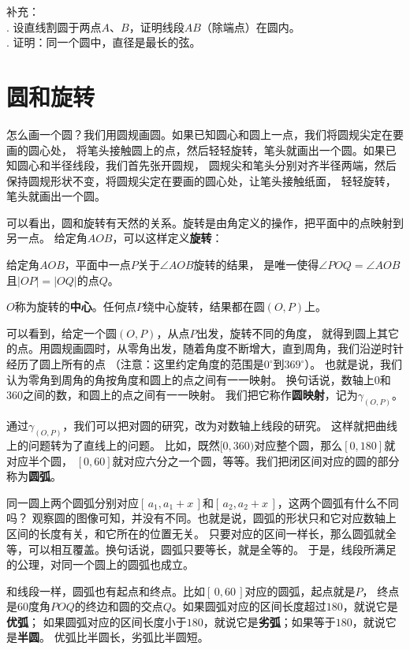 \documentclass[12pt,UTF8,fontset=none]{ctexbook}
\begin{document}
\begin{xt}\label{xt:0-0-0}
    补充：\\
    . 设直线割圆于两点$A$、$B$，证明线段$AB$（除端点）在圆内。\\
    . 证明：同一个圆中，直径是最长的弦。
\end{xt}

\section{圆和旋转}
怎么画一个圆？我们用圆规画圆。如果已知圆心和圆上一点，我们将圆规尖定在要画的圆心处，
将笔头接触圆上的点，然后轻轻旋转，笔头就画出一个圆。如果已知圆心和半径线段，我们首先张开圆规，
圆规尖和笔头分别对齐半径两端，然后保持圆规形状不变，将圆规尖定在要画的圆心处，让笔头接触纸面，
轻轻旋转，笔头就画出一个圆。

可以看出，圆和旋转有天然的关系。旋转是由角定义的操作，把平面中的点映射到另一点。
给定角$AOB$，可以这样定义\textbf{旋转}：

\begin{df}\label{df:0-1-0}
    给定角$AOB$，平面中一点$P$关于$\angle AOB$旋转的结果，
    是唯一使得$\angle POQ = \angle AOB$且$|OP| = |OQ|$的点$Q$。
\end{df}
$O$称为旋转的\textbf{中心}。任何点$P$绕中心旋转，结果都在圆$(O,P)$上。

可以看到，给定一个圆$(O,P)$，从点$P$出发，旋转不同的角度，
就得到圆上其它的点。用圆规画圆时，从零角出发，随着角度不断增大，直到周角，我们沿逆时针经历了圆上所有的点
（注意：这里约定角度的范围是$0^\circ$到$369^\circ$）。
也就是说，我们认为零角到周角的角按角度和圆上的点之间有一一映射。
换句话说，数轴上$0$和$360$之间的数，和圆上的点之间有一一映射。
我们把它称作\textbf{圆映射}，记为$\gamma_{(O,P)}$。

通过$\gamma_{(O,P)}$，我们可以把对圆的研究，改为对数轴上线段的研究。
这样就把曲线上的问题转为了直线上的问题。
比如，既然$[0, 360)$对应整个圆，那么$[0,180]$就对应半个圆，
$[0,60]$就对应六分之一个圆，等等。我们把闭区间对应的圆的部分称为\textbf{圆弧}。

同一圆上两个圆弧分别对应$[\, a_1, a_1+x\, ]$和$[\, a_2, a_2+x \,]$，这两个圆弧有什么不同吗？
观察圆的图像可知，并没有不同。也就是说，圆弧的形状只和它对应数轴上区间的长度有关，和它所在的位置无关。
只要对应的区间一样长，那么圆弧就全等，可以相互覆盖。换句话说，圆弧只要等长，就是全等的。
于是，线段所满足的公理，对同一个圆上的圆弧也成立。

和线段一样，圆弧也有起点和终点。比如$[\, 0,60\, ]$对应的圆弧，起点就是$P$，
终点是$60$度角$POQ$的终边和圆的交点$Q$。如果圆弧对应的区间长度超过$180$，就说它是\textbf{优弧}；
如果圆弧对应的区间长度小于$180$，就说它是\textbf{劣弧}；如果等于$180$，就说它是\textbf{半圆}。
优弧比半圆长，劣弧比半圆短。
\end{document}
